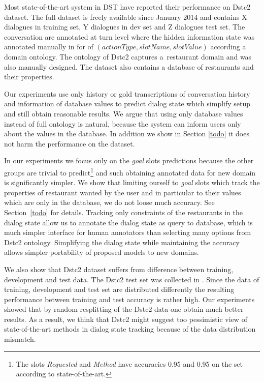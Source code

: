 \documentclass{itatnew}
\begin{document}
Most state-of-the-art system in DST have reported their performance on Dstc2 dataset\cite{dstc2henderson}. 
The full dataset is freely available since January 2014 and contains X dialogues in training set, Y dialogues in dev set and Z dialogues test set.
The conversation are annotated at turn level where the hidden information state was annotated manually in for of $(actionType, slotName, slotValue)$
according a domain ontology.
The ontology of Dstc2 captures a~restaurant domain and was also manually designed.
The dataset also contains a database of restaurants and their properties.

Our experiments use only history  or gold transcriptions of conversation history and information of database values to predict dialog state which simplify setup and still obtain reasonable results.
We argue that using only database values instead of full ontology is natural, because the system can inform users only about the values in the database.
In addition we show in Section \ref{todo} it does not harm the performance on the dataset.

In our experiments we focus only on the {\it goal} slots predictions because the other groups are trivial to predict\footnote{The slots {\it Requested} and {\it Method} have accuracies 0.95 and 0.95 on the set according to state-of-the-art\cite{JWilliams}.} and such obtaining annotated data for new domain is significantly simpler.
We show that limiting ourself to {\it goal} slots which track the properties of restaurant wanted by the user  and in particular to their values which are only in the database, we do not loose much accuracy.
See Section~\ref{todo} for details.
Tracking only constraints of the restaurants in the dialog state allow us to annotate the dialog state as query to database, which is much simpler interface for human annotators than selecting many options from Dstc2 ontology.
Simplifying the dialog state while maintaining the accuracy allows simpler portability of proposed models to new domains.

We also show that Dstc2 dataset suffers from difference between training, development and test data.
The Dstc2 test set was collected in  \cite{dstc2henderson}.
Since the data of training, development and test set are distributed differently the resulting performance between training and test accuracy is rather high. 
Our experiments showed that by random resplitting of the Dstc2 data one obtain much better results.
As a result, we think that Dstc2 might suggest too pessimistic view of state-of-the-art methods in dialog state tracking because of the data distribution mismatch.
\end{document}
